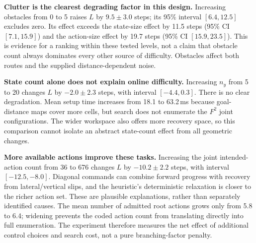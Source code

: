 \textbf{Clutter is the clearest degrading factor in this design.}
Increasing obstacles from 0 to 5 raises $L$ by $9.5\pm3.0$ steps; its
95\% interval $[6.4,12.5]$ excludes zero. Its effect exceeds the state-size
effect by 11.5 steps (95\% CI $[7.1,15.9]$) and the action-size effect by
19.7 steps (95\% CI $[15.9,23.5]$). This is evidence for a ranking within
these tested levels, not a claim that obstacle count always dominates every
other source of difficulty. Obstacles affect both routes and the supplied
distance-dependent noise.

\textbf{State count alone does not explain online difficulty.}
Increasing $n_y$ from 5 to 20 changes $L$ by $-2.0\pm2.3$ steps,
with interval $[-4.4,0.3]$. There is no clear degradation. Mean setup time
increases from 18.1 to 63.2\,ms because goal-distance maps cover more cells,
but search does not enumerate the $F^2$ joint configurations. The wider
workspace also offers more recovery space, so this comparison cannot isolate
an abstract state-count effect from all geometric changes.

\textbf{More available actions improve these tasks.}
Increasing the joint intended-action count from 36 to 676 changes $L$ by
$-10.2\pm2.2$ steps, with interval $[-12.5,-8.0]$. Diagonal commands can
combine forward progress with recovery from lateral/vertical slips, and
the heuristic's deterministic relaxation is closer to the richer action set.
These are plausible explanations, rather than separately identified causes.
The mean number of admitted root actions grows only from 5.8 to 6.4;
widening prevents the coded action count from translating directly into full
enumeration. The experiment therefore measures the net effect of additional
control choices and search cost, not a pure branching-factor penalty.
